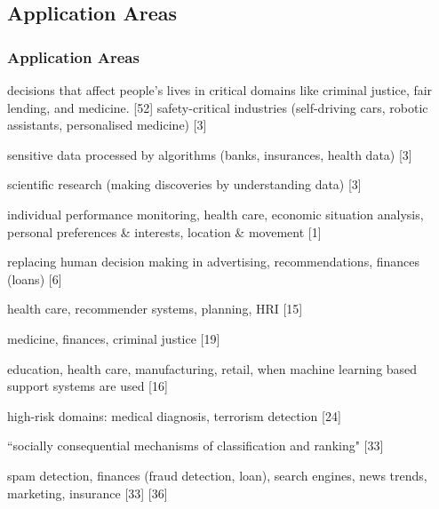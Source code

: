 \subsection{Application Areas}

\subsubsection{Application Areas}
decisions that affect people’s lives in critical domains like criminal
justice, fair lending, and medicine. [52]\newline
safety-critical industries (self-driving cars, robotic assistants, personalised medicine) [3]\newline

sensitive data processed by algorithms (banks, insurances, health data) [3]\newline

scientific research (making discoveries by understanding data) [3]\newline

individual performance monitoring, health care, economic situation analysis, personal preferences \& interests, location \& movement [1]\newline

replacing human decision making in advertising, recommendations, finances (loans) [6] \newline

health care, recommender systems, planning, HRI [15]\newline

medicine, finances, criminal justice [19] \newline

education, health care, manufacturing, retail, when machine learning based support systems are used [16] \newline

high-risk domains: medical diagnosis, terrorism detection [24] \newline

``socially consequential mechanisms of classification and ranking" [33] \newline

spam detection, finances (fraud detection, loan), search engines, news trends, marketing, insurance [33] [36] \newline

